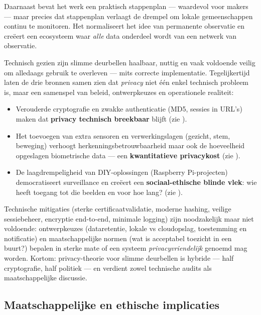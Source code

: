 \documentclass[nonacm, sigconf]{acmart}
\begin{document}
    \noindent
    Daarnaast bevat het werk een praktisch stappenplan — waardevol voor makers — maar precies dat stappenplan verlaagt de drempel om lokale gemeenschappen continu te monitoren. Het normaliseert het idee van permanente observatie en creëert een ecosysteem waar \emph{alle} data onderdeel wordt van een netwerk van observatie.

    \bigskip

    \noindent Technisch gezien zijn slimme deurbellen haalbaar, nuttig en vaak voldoende veilig om alledaags gebruik te overleven — mits correcte implementatie. Tegelijkertijd laten de drie bronnen samen zien dat \emph{privacy} niet één enkel technisch probleem is, maar een samenspel van beleid, ontwerpkeuzes en operationele realiteit:
    \begin{itemize}
        \item Verouderde cryptografie en zwakke authenticatie (MD5, sessies in URL's) maken dat \textbf{privacy technisch breekbaar} blijft (zie \parencite{liu2021ethical}).
        \item Het toevoegen van extra sensoren en verwerkingslagen (gezicht, stem, beweging) verhoogt herkenningsbetrouwbaarheid maar ook de hoeveelheid opgeslagen biometrische data — een \textbf{kwantitatieve privacykost} (zie \parencite{chaudhari2020smart}).
        \item De laagdrempeligheid van DIY-oplossingen (Raspberry Pi-projecten) democratiseert surveillance en creëert een \textbf{sociaal-ethische blinde vlek}: wie heeft toegang tot die beelden en voor hoe lang? (zie \parencite{lalitha2019smart}).
    \end{itemize}

    \noindent
    Technische mitigaties (sterke certificaatvalidatie, moderne hashing, veilige sessiebeheer, encryptie end-to-end, minimale logging) zijn noodzakelijk maar niet voldoende: ontwerpkeuzes (dataretentie, lokale vs cloudopslag, toestemming en notificatie) en maatschappelijke normen (wat is acceptabel toezicht in een buurt?) bepalen in sterke mate of een systeem \emph{privacyvriendelijk} genoemd mag worden. Kortom: privacy-theorie voor slimme deurbellen is hybride — half cryptografie, half politiek — en verdient zowel technische audits als maatschappelijke discussie.

    \subsection{Maatschappelijke en ethische implicaties}
\end{document}
